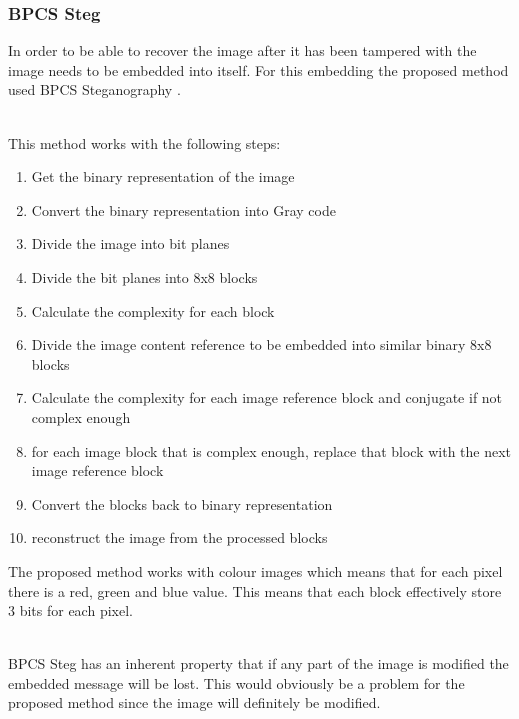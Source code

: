 \documentclass[12pt]{article}
\begin{document}
\subsubsection{BPCS Steg}
\label{bpcsSteg}
In order to be able to recover the image after it has been tampered with the image needs to be embedded into itself. 
For this embedding the proposed method used BPCS Steganography \cite{beaullieubpcs}.

\hspace{0pt} \\
This method works with the following steps:
\begin{enumerate}
  \item Get the binary representation of the image
  \item Convert the binary representation into Gray code
  \item Divide the image into bit planes
  \item Divide the bit planes into 8x8 blocks
  \item Calculate the complexity for each block
  \item Divide the image content reference to be embedded into similar binary 8x8 blocks
  \item Calculate the complexity for each image reference block and conjugate if not complex enough
  \item for each image block that is complex enough, replace that block with the next image reference block
  \item Convert the blocks back to binary representation
  \item reconstruct the image from the processed blocks 
\end{enumerate}
The proposed method works with colour images which means that for each pixel there is a red, green and blue value. This means that each block effectively store 3 bits for each pixel. 

\hspace{0pt} \\
BPCS Steg has an inherent property that if any part of the image is modified the embedded message will be lost.
This would obviously be a problem for the proposed method since the image will definitely be modified.
\end{document}
